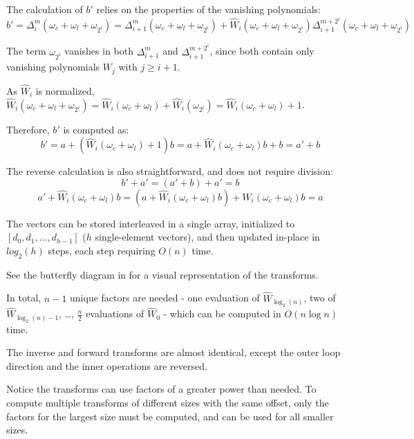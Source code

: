 The calculation of $b'$ relies on the properties of the vanishing polynomials:
\[b' = \Delta_i^{m}(\omega_c + \omega_l + \omega_{2^i}) = \Delta_{i+1}^m(\omega_c + \omega_l + \omega_{2^i}) + \hat{W}_i(\omega_c + \omega_l + \omega_{2^i}) \Delta_{i+1}^{m + 2^i}(\omega_c + \omega_l + \omega_{2^i})\]

The term $\omega_{2^i}$ vanishes in both $\Delta_{i+1}^m$ and $\Delta_{i+1}^{m + 2^i}$, since both contain only vanishing polynomials $W_j$ with $j \geq i + 1$.

As $\hat{W}_i$ is normalized, $\hat{W}_i(\omega_c + \omega_l + \omega_{2^i}) = \hat{W}_i(\omega_c + \omega_l) + \hat{W}_i(\omega_{2^i}) = \hat{W}_i(\omega_c + \omega_l) + 1$.

Therefore, $b'$ is computed as:
\[b' = a + (\hat{W}_i(\omega_c + \omega_l) + 1) b = a + \hat{W}_i(\omega_c + \omega_l) b + b = a' + b\]

The reverse calculation is also straightforward, and does not require division:
\[b' + a' = (a' + b) + a' = b\]
\[a' + \hat{W}_i(\omega_c + \omega_l) b = (a + \hat{W}_i(\omega_c + \omega_l) b) + \hat{W}_i(\omega_c + \omega_l) b = a\]

The vectors can be stored interleaved in a single array, initialized to $[d_0, d_1, \ldots, d_{h - 1}]$ ($h$ single-element vectors), and then updated in-place in $log_2(h)$ steps, each step requiring $O(n)$ time.

See the butterfly diagram in \cite{novel-poly} for a visual representation of the transforms.

In total, $n - 1$ unique factors are needed - one evaluation of $\hat{W}_{\log_2(n)}$, two of $\hat{W}_{\log_2(n) - 1}$, \ldots, $\frac{n}{2}$ evaluations of $\hat{W}_0$ - which can be computed in $O(n \log n)$ time.

The inverse and forward transforms are almost identical, except the outer loop direction and the inner operations are reversed.

\enlargethispage{\baselineskip} %

Notice the transforms can use factors of a greater power than needed. To compute multiple transforms of different sizes with the same offset, only the factors for the largest size must be computed, and can be used for all smaller sizes.

